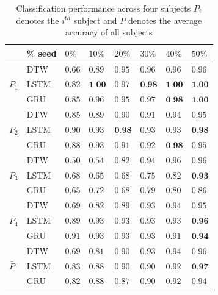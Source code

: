 \documentclass[10pt,twocolumn,letterpaper]{article}
\begin{document}
\begin{table}[h]
	\begin{center}
		\begin{tabular}{|m{1em} | m{3em} | m{1.5em} | m{1.5em} | m{1.5em} |m{1.5em} |m{1.5em} |m{1.5em} |}
			\hline
			& \% seed & $0\%$ & $10\%$ & $20\%$ & $30\%$ & $40\%$ & $50\%$\\
			\hline
			\multirow{3}{3.5em}{$P_1$}
			& DTW & $0.66$ & $0.89$ & $0.95$ & $0.96$ & $0.96$ & $0.96$\\
			\cline{2-8}
			& LSTM & $0.82$ & $\textbf{1.00}$ & $0.97$ & $\textbf{0.98}$ & $\textbf{1.00}$ & $\textbf{1.00}$\\			
			\cline{2-8}
			& GRU & $0.85$ & $0.96$ & $0.95$ & $0.97$ & $\textbf{0.98}$ & $\textbf{1.00}$\\
			\hline
			\multirow{3}{3.5em}{$P_2$}
			& DTW & $0.85$ & $0.89$ & $0.90$ & $0.91$ & $0.94$ & $0.95$\\
			\cline{2-8}
			& LSTM & $0.90$ & $0.93$ & $\textbf{0.98}$ & $0.93$ & $0.93$ & $\textbf{0.98}$\\
			\cline{2-8}
			& GRU & $0.88$ & $0.93$ & $0.91$ & $0.92$ & $\textbf{0.98}$ & $0.95$\\
			\hline
			\multirow{3}{3.5em}{$P_3$}
			& DTW & $0.50$ & $0.54$ & $0.82$ & $0.94$ & $0.96$ & $0.96$\\
			\cline{2-8}
			& LSTM & $0.68$ & $0.65$ & $0.68$ & $0.75$ & $0.82$ & $\textbf{0.93}$\\
			\cline{2-8}
			& GRU & $0.65$ & $0.72$ & $0.68$ & $0.79$ & $0.80$ & $0.86$\\
			\hline
			\multirow{3}{3.5em}{$P_4$}
			& DTW & $0.69$ & $0.82$ & $0.89$ & $0.93$ & $0.94$ & $0.95$\\
			\cline{2-8}
			& LSTM & $0.89$ & $0.93$ & $0.93$ & $0.93$ & $0.93$ & $\textbf{0.96}$\\
			\cline{2-8}
			& GRU & $0.91$ & $0.93$ & $0.93$ & $0.93$ & $0.91$ & $\textbf{0.94}$\\
			\hline
			\multirow{3}{3.5em}{$\bar{P}$}
			& DTW & $0.69$ & $0.81$ & $0.90$ & $0.93$ & $0.94$ & $0.96$\\
			\cline{2-8}
			& LSTM & $0.83$ & $0.88$ & $0.90$ & $0.90$ & $0.92$ & $\textbf{0.97}$\\
			\cline{2-8}
			& GRU & $0.82$ & $0.88$ & $0.87$ & $0.90$ & $0.92$ & $0.94$\\
			\hline
		\end{tabular}
	\end{center}
	\caption{Classification performance across four subjects  $P_i$ denotes the $i^{th}$ subject and $\bar{P}$ denotes the average accuracy of all subjects}
	\label{table:result_table}
\end{table}
\end{document}

